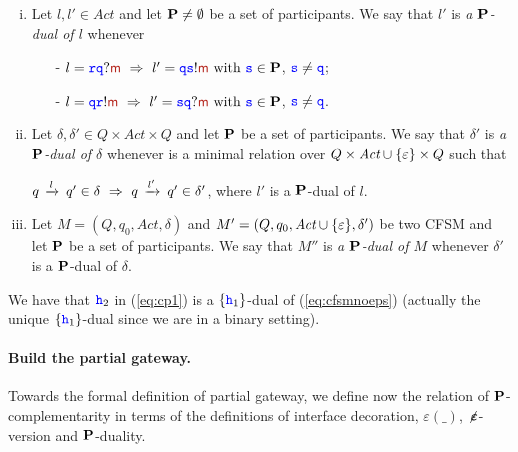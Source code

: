 \begin{definition}\label{def:PD}%
\begin{enumerate}[i)]
\item
Let $l,l'\in\textit{Act}$ and  let $\mathbf{P}\neq\emptyset$ be a set of participants.
We say that $l'$ is {\em a $\mathbf{P}$-dual of $l$} whenever 
\begin{itemize}
\item[-]
$l = \ttr\ttq?\msg[m] \implies l'= \ttq\tts!\msg[m] \text{ with } \tts\in\roles$, ${\mathtt{\color{blue}{ {s}}}}\neq{ \ensuremath{\mathtt{\color{blue}{ {q}}}} }$;
\item[-]
$l = \ttq\ttr!\msg[m] \implies l'= \tts\ttq?\msg[m] \text{ with } \tts\in\roles$, ${\mathtt{\color{blue}{ {s}}}}\neq{ \ensuremath{\mathtt{\color{blue}{ {q}}}} }$.
\end{itemize}
\item
Let $\delta,\delta'\in Q\times\textit{Act}\times Q$ and  let $\mathbf{P}$ be a set of participants.
We say that $\delta'$ is {\em a $\mathbf{P}$-dual of $\delta$} whenever is a minimal relation over
 $Q\times\textit{Act}\cup\{\varepsilon\}\times Q$ such that\\
\centerline{
$q\,\xrightarrow{l}_{{}}\,q'\in\delta ~\Rightarrow~ q\,\xrightarrow{l'}_{{}}\,q'\in\delta'$, where $l'$ is a $\mathbf{P}$-dual of $l$.
}
\item
Let $M=(Q,q_0,\textit{Act},\delta)$ and $M'=(Q,q_0,\textit{Act}\cup\{\varepsilon\},\delta')$ be two CFSM and  let $\mathbf{P}$ be a set of participants.
We say that $M''$ is {\em a $\mathbf{P}$-dual of $M$} whenever $\delta'$ is a $\mathbf{P}$-dual of $\delta$.
\end{enumerate}
\end{definition}

\smallskip
\noindent
We have that ${\mathtt{\color{blue}{ {h}}}}_2$ in (\ref{eq:cp1}) is a $\{{\mathtt{\color{blue}{ {h}}}}_1\}$-dual of (\ref{eq:cfsmnoeps}) (actually the
unique $\{{\mathtt{\color{blue}{ {h}}}}_1\}$-dual since we are in a binary setting).

\paragraph{Build the partial gateway.}
Towards the formal definition of partial gateway, 
we define now the relation of $\mathbf{P}$-complementarity in terms of the definitions of interface decoration,
$\varepsilon(\_)$, $\not\hspace{-1pt}\bm{\varepsilon}$-version and $\mathbf{P}$-duality.


